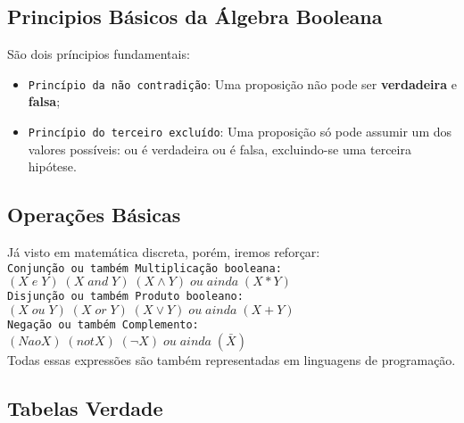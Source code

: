\documentclass[12pt, onecolumn]{article}
\begin{document}
	\subsection{\centering Principios Básicos da Álgebra Booleana}
	
	São dois príncipios fundamentais:\\

	\begin{itemize}
		\item \texttt{Princípio da não contradição}: Uma proposição não pode 
			ser \textbf{verdadeira} e \textbf{falsa};\\
		\item \texttt{Princípio do terceiro excluído}: Uma proposição só pode
			assumir um dos valores possíveis: ou é verdadeira ou é falsa, 
			excluindo-se uma terceira hipótese.\\
	\end{itemize}

	\subsection{\centering Operações Básicas}

	Já visto em matemática discreta, porém, iremos reforçar:\\
	\newline
	\texttt{Conjunção ou também Multiplicação booleana:}\\
	$(X\;e\;Y) \; (X\;and\;Y)\;(X \land Y)\;ou\;ainda\;(X * Y)$\\
	\newline
	\texttt{Disjunção ou também Produto booleano:}\\
	$(X\;ou\;Y) \; (X\;or\;Y) \; (X \lor Y)\;ou\;ainda\;(X + Y)$\\
	\newline
	\texttt{Negação ou também Complemento:}\\
	$(Nao X) \; (not X) \; (\lnot X)\;ou\;ainda\;(\bar{X})$\\
	\newline
	Todas essas expressões são também representadas em linguagens de 
	programação.\\
		
	\subsection{\centering Tabelas Verdade}
	
\end{document}
